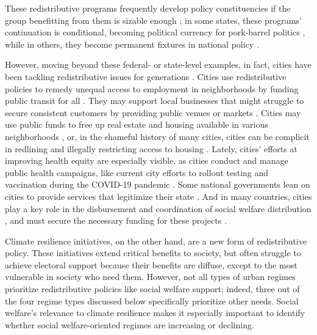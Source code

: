 \documentclass[preprint, 3p,
authoryear]{elsarticle} %
\begin{document}
These redistributive programs frequently develop policy constituencies
if the group benefitting from them is sizable enough
\citep{meltzer_and_richard_1981, campbell_2012}; in some states, these
programs' continuation is conditional, becoming political currency for
pork-barrel politics \citep{fukui_and_fukai_1996, catalinac_et_al_2020},
while in others, they become permanent fixtures in national policy
\citep{pierson_1994}.

However, moving beyond these federal- or state-level examples, in fact,
cities have been tackling redistributive issues for generations
\citep{peterson_1981, saiz_1999, tonkiss_2020}. Cities use
redistributive policies to remedy unequal access to employment in
neighborhoods by funding public transit for all
\citep{frankena_1973, asensio_et_al_2003, glaeser_et_al_2009, fearnley_and_aarhaug_2019, wiesel_and_liu_2021}.
They may support local businesses that might struggle to secure
consistent customers by providing public venues or markets
\citep{tangires_1997}. Cities may use public funds to free up real
estate and housing available in various neighborhoods
\citep{detter_and_folster_2017}, or, in the shameful history of many
cities, cities can be complicit in redlining and illegally restricting
access to housing \citep{rothstein_2017}. Lately, cities' efforts at
improving health equity are especially visible, as cities conduct and
manage public health campaigns, like current city efforts to rollout
testing and vaccination during the COVID-19 pandemic
\citep{berkowitz_and_basu_2021}. Some national governments lean on
cities to provide services that legitimize their state
\citep{wallace_2013}. And in many countries, cities play a key role in
the disbursement and coordination of social welfare distribution
\citep{katz_and_allen_2001, weir_and_kind_2021}, and must secure the
necessary funding for these projects \citep{payson_2022}.

Climate resilience initiatives, on the other hand, are a new form of
redistributive policy. These initiatives extend critical benefits to
society, but often struggle to achieve electoral support because their
benefits are diffuse, except to the most vulnerable in society who need
them. However, not all types of urban regimes prioritize redistributive
policies like social welfare support; indeed, three out of the four
regime types discussed below specifically prioritize other needs. Social
welfare's relevance to climate resilience makes it especially important
to identify whether social welfare-oriented regimes are increasing or
declining.
\end{document}
